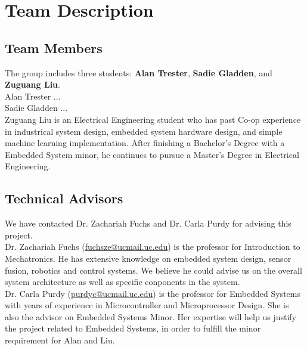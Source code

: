 \chapter{Team Description}

\section{Team Members}
	The group includes three students: \textbf{Alan Trester}, \textbf{Sadie Gladden}, and \textbf{Zuguang Liu}. \\
	
	Alan Trester ... \\
	
	Sadie Gladden ... \\
	
	Zuguang Liu is an Electrical Engineering student who has past Co-op experience in industrical system design, embedded system hardware design, and simple machine learning implementation. After finishing a Bachelor's Degree with a Embedded System minor, he continues to pursue a Master's Degree in Electrical Engineering. 
	
\section{Technical Advisors} 

	We have contacted Dr. Zachariah Fuchs and Dr. Carla Purdy for advising this project. \\
	
	Dr. Zachariah Fuchs (\href{fuchsze@ucmail.uc.edu}{fuchsze@ucmail.uc.edu}) is the professor for Introduction to Mechatronics. He has extensive knowledge on embedded system design, sensor fusion, robotics and control systems. We believe he could advise us on the overall system architecture as well as specific conponents in the system. \\
	
	Dr. Carla Purdy (\href{purdyc@ucmail.uc.edu}{purdyc@ucmail.uc.edu}) is the professor for Embedded Systems with years of experience in Microcontroller and Microprocessor Design. She is also the advisor on Embedded Systems Minor. Her expertise will help us justify the project related to Embedded Systems, in order to fulfill the minor requirement for Alan and Liu. \\

	